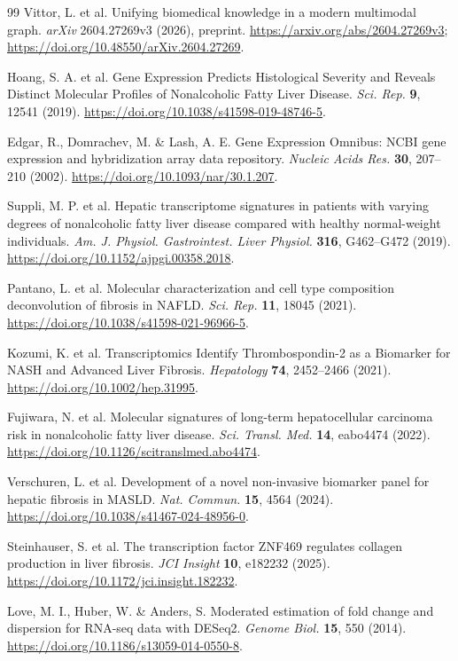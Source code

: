 \documentclass[11pt,a4paper]{article}
\begin{document}
\begin{thebibliography}{99}
 Vittor, L. et al. Unifying biomedical knowledge in a modern multimodal graph. \textit{arXiv} 2604.27269v3 (2026), preprint. \url{https://arxiv.org/abs/2604.27269v3}; \url{https://doi.org/10.48550/arXiv.2604.27269}.

 Hoang, S. A. et al. Gene Expression Predicts Histological Severity and Reveals Distinct Molecular Profiles of Nonalcoholic Fatty Liver Disease. \textit{Sci. Rep.} \textbf{9}, 12541 (2019). \url{https://doi.org/10.1038/s41598-019-48746-5}.

 Edgar, R., Domrachev, M. \& Lash, A. E. Gene Expression Omnibus: NCBI gene expression and hybridization array data repository. \textit{Nucleic Acids Res.} \textbf{30}, 207–210 (2002). \url{https://doi.org/10.1093/nar/30.1.207}.

 Suppli, M. P. et al. Hepatic transcriptome signatures in patients with varying degrees of nonalcoholic fatty liver disease compared with healthy normal-weight individuals. \textit{Am. J. Physiol. Gastrointest. Liver Physiol.} \textbf{316}, G462–G472 (2019). \url{https://doi.org/10.1152/ajpgi.00358.2018}.

 Pantano, L. et al. Molecular characterization and cell type composition deconvolution of fibrosis in NAFLD. \textit{Sci. Rep.} \textbf{11}, 18045 (2021). \url{https://doi.org/10.1038/s41598-021-96966-5}.

 Kozumi, K. et al. Transcriptomics Identify Thrombospondin-2 as a Biomarker for NASH and Advanced Liver Fibrosis. \textit{Hepatology} \textbf{74}, 2452–2466 (2021). \url{https://doi.org/10.1002/hep.31995}.

 Fujiwara, N. et al. Molecular signatures of long-term hepatocellular carcinoma risk in nonalcoholic fatty liver disease. \textit{Sci. Transl. Med.} \textbf{14}, eabo4474 (2022). \url{https://doi.org/10.1126/scitranslmed.abo4474}.

 Verschuren, L. et al. Development of a novel non-invasive biomarker panel for hepatic fibrosis in MASLD. \textit{Nat. Commun.} \textbf{15}, 4564 (2024). \url{https://doi.org/10.1038/s41467-024-48956-0}.

 Steinhauser, S. et al. The transcription factor ZNF469 regulates collagen production in liver fibrosis. \textit{JCI Insight} \textbf{10}, e182232 (2025). \url{https://doi.org/10.1172/jci.insight.182232}.

 Love, M. I., Huber, W. \& Anders, S. Moderated estimation of fold change and dispersion for RNA-seq data with DESeq2. \textit{Genome Biol.} \textbf{15}, 550 (2014). \url{https://doi.org/10.1186/s13059-014-0550-8}.


\end{thebibliography}
\end{document}
